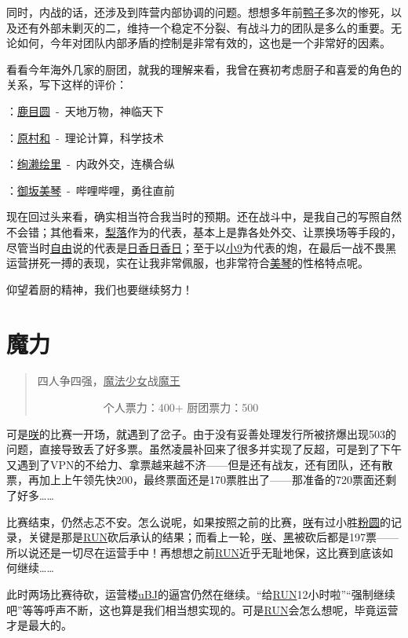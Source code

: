 同时，内战的话，还涉及到阵营内部协调的问题。想想多年前\uline{鸭子}多次的惨死，以及还有外部未剿灭的二，维持一个稳定不分裂、有战斗力的团队是多么的重要。无论如何，今年对团队内部矛盾的控制是非常有效的，这也是一个非常好的因素。

\newpage

看看今年海外几家的厨团，就我的理解来看，我曾在赛初考虑厨子和喜爱的角色的关系，写下这样的评价：

：\uline{鹿目圆}~-~天地万物，神临天下

：\uline{原村和}~-~理论计算，科学技术

：\uline{绚濑绘里}~-~内政外交，连横合纵

：\uline{御坂美琴}~-~哔哩哔哩，勇往直前

现在回过头来看，确实相当符合我当时的预期。还在战斗中，是我自己的写照自然不会错；其他看来，\uline{梨落}作为的代表，基本上是靠各处外交、让票换场等手段的，尽管当时\uline{自由}说的代表是\uline{日香日香日}；至于以\uline{小9}为代表的炮，在最后一战不畏黑运营拼死一搏的表现，实在让我非常佩服，也非常符合\uline{美琴}的性格特点呢。

仰望着厨的精神，我们也要继续努力！

\chapter{魔力}
\begin{quote}
四人争四强，\uline{魔法少女}战\uline{魔王}

　　　　　　个人票力：400+ 厨团票力：500
\end{quote}

可是\uline{咲}的比赛一开场，就遇到了岔子。由于没有妥善处理发行所被挤爆出现503的问题，直接导致丢了好多票。虽然凌晨补回来了很多并实现了反超，可是到了下午又遇到了VPN的不给力、拿票越来越不济——但是还有战友，还有团队，还有散票，再加上上午领先快200，最终票面还是170票胜出了——那准备的720票面还剩了好多……

比赛结束，仍然忐忑不安。怎么说呢，如果按照之前的比赛，\uline{咲}有过小胜\uline{粉圆}的记录，关键是那是\uline{RUN}砍后承认的结果；而看上一轮，\uline{咲}、\uline{黑}被砍后都是197票——所以说还是一切尽在运营手中！再想想之前\uline{RUN}近乎无耻地保，这比赛到底该如何继续……

此时两场比赛待砍，运营楼\uline{uBJ}的逼宫仍然在继续。“给\uline{RUN}12小时啦”“强制继续吧”等等呼声不断，这也算是我们相当想实现的。可是\uline{RUN}会怎么想呢，毕竟运营才是最大的。

